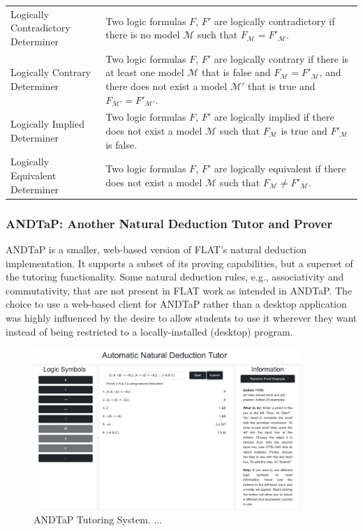 \documentclass[ms]{uncgdissertationexp2}
\theoremstyle{plain}
\theoremstyle{definition}
\theoremstyle{remark}
\newcommand{\titlecaption}[2]{\caption[#1]{#1. #2}}
\begin{document}
\begin{table}
\begin{tabular}{p{3cm}p{11cm}}
	  Logically Contradictory Determiner&Two logic formulas $F$, $F'$ are logically contradictory if there is no model $\mathcal{M}$ such that $F_{\mathcal{M}} = F'_{\mathcal{M}}.$\\
	  Logically Contrary Determiner&Two logic formulas $F$, $F'$ are logically contrary if there is at least one model $\mathcal{M}$ that is false and $F_{\mathcal{M}} = F'_{\mathcal{M}}$, and there does not exist a model $\mathcal{M'}$ that is true and $F_{\mathcal{M'}} = F'_{\mathcal{M'}}$.\\
	  Logically Implied Determiner&Two logic formulas $F$, $F'$ are logically implied if there does not exist a model $\mathcal{M}$ such that $F_{\mathcal{M}}$ is true and $F'_{\mathcal{M}}$ is false.\\
	  Logically Equivalent Determiner&Two logic formulas $F$, $F'$ are logically equivalent if there does not exist a model $\mathcal{M}$ such that $F_{\mathcal{M}} \neq F'_{\mathcal{M}}$.\\
	\bottomrule
  \end{tabular}
\end{table}

\subsubsection{ANDTaP: Another Natural Deduction Tutor and Prover}\label{section:andtap}
ANDTaP is a smaller, web-based version of FLAT's natural deduction implementation. It supports a subset of its proving capabilities, but a superset of the tutoring functionality. Some natural deduction rules, e.g., associativity and commutativity, that are not present in FLAT work as intended in ANDTaP. The choice to use a web-based client for ANDTaP rather than a desktop application was highly influenced by the desire to allow students to use it wherever they want instead of being restricted to a locally-installed (desktop) program.

\begin{figure}[!ht]
	\centering
	\includegraphics[width=0.9\textwidth]{andtap-tutor.png}
	\titlecaption{ANDTaP Tutoring System}{...}
	\label{fig:andtap}
\end{figure} 
\end{document}
